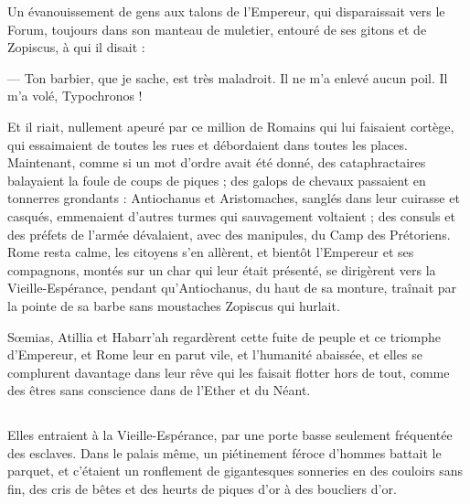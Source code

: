 \documentclass[a4paper, 11pt, oneside, polutonikogreek, french]{article}
\begin{document}
Un évanouissement de gens aux talons de l'Empereur, qui disparaissait vers le Forum, toujours dans son manteau de muletier, entouré de ses gitons et de Zopiscus, à qui il disait :

--- Ton barbier, que je sache, est très maladroit. Il ne m'a enlevé aucun poil. Il m'a volé, Typochronos !

Et il riait, nullement apeuré par ce million de Romains qui lui faisaient cortège, qui essaimaient de toutes les rues et débordaient dans toutes les places. Maintenant, comme si un mot d'ordre avait été donné, des cataphractaires balayaient la foule de coups de piques ; des galops de chevaux passaient en tonnerres grondants : Antiochanus et Aristomaches, sanglés dans leur cuirasse et casqués, emmenaient d'autres turmes qui sauvagement voltaient ; des consuls et des préfets de l'armée dévalaient, avec des manipules, du Camp des Prétoriens. Rome resta calme, les citoyens s'en allèrent, et bientôt l'Empereur et ses compagnons, montés sur un char qui leur était présenté, se dirigèrent vers la Vieille-Espérance, pendant qu'Antiochanus, du haut de sa monture, traînait par la pointe de sa barbe sans moustaches Zopiscus qui hurlait.

Sœmias, Atillia et Habarr'ah regardèrent cette fuite de peuple et ce triomphe d'Empereur, et Rome leur en parut vile, et l'humanité abaissée, et elles se complurent davantage dans leur rêve qui les faisait flotter hors de tout, comme des êtres sans conscience dans de l'Ether et du Néant.
\clearpage
\subsection{}
\paragraph{}
Elles entraient à la Vieille-Espérance, par une porte basse seulement fréquentée des esclaves. Dans le palais même, un piétinement féroce d'hommes battait le parquet, et c'étaient un ronflement de gigantesques sonneries en des couloirs sans fin, des cris de bêtes et des heurts de piques d'or à des boucliers d'or.
\end{document}
